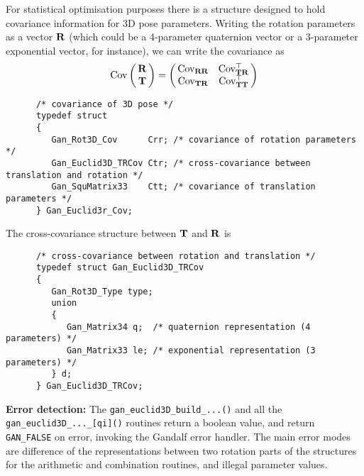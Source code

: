 For statistical optimisation purposes there is a structure designed to hold
covariance information for 3D pose parameters. Writing the rotation
parameters as a vector ${\bf R}$ (which could be a 4-parameter quaternion vector
or a 3-parameter exponential vector, for instance), we can write the
covariance as
\[ \Cov \beginm{c} \Rvec \\ \Tvec \endm
   = \beginm{cc} \Cov_{\Rvec\Rvec} & \Cov_{\Tvec\Rvec}\tr \\
                 \Cov_{\Tvec\Rvec} & \Cov_{\Tvec\Tvec}\tr \endm
\]
\begin{verbatim}
      /* covariance of 3D pose */
      typedef struct
      {
         Gan_Rot3D_Cov      Crr; /* covariance of rotation parameters */
         Gan_Euclid3D_TRCov Ctr; /* cross-covariance between translation and rotation */
         Gan_SquMatrix33    Ctt; /* covariance of translation parameters */
      } Gan_Euclid3r_Cov;
\end{verbatim}
The cross-covariance structure between ${\bf T}$ and ${\bf R}$ is
\begin{verbatim}
      /* cross-covariance between rotation and translation */
      typedef struct Gan_Euclid3D_TRCov
      {
         Gan_Rot3D_Type type;
         union
         {
            Gan_Matrix34 q;  /* quaternion representation (4 parameters) */
            Gan_Matrix33 le; /* exponential representation (3 parameters) */
         } d;
      } Gan_Euclid3D_TRCov;
\end{verbatim}

{\bf Error detection:} The {\tt gan\_euclid3D\_build\_...()} and all the
{\tt gan\_euclid3D\_...\_[qi]()} routines return a boolean value,
and return {\tt GAN\_FALSE} on error, invoking the Gandalf error handler.
The main error modes are difference of the representations between two
rotation parts of the structures for the arithmetic and combination routines,
and illegal parameter values.

